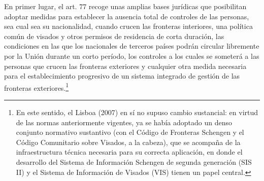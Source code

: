 \documentclass[10pt,a4paper]{article}
\begin{document}
En primer lugar, el art. $77$ recoge unas amplias bases jurídicas que posibilitan adoptar medidas para establecer la ausencia total de controles de las personas, sea cual sea su nacionalidad, cuando crucen las fronteras interiores, una política común de visados y otros permisos de residencia de corta duración, las condiciones en las que los nacionales de terceros países podrán circular libremente por la Unión durante un corto período, los controles a los cuales se someterá a las personas que crucen las fronteras exteriores y cualquier otra medida necesaria para el establecimiento progresivo de un sistema integrado de gestión de las fronteras exteriores.\footnote{%
    En este sentido, el Lisboa (2007) en sí no supuso cambio sustancial: en virtud de las normas anteriormente vigentes, ya se había adoptado un denso conjunto normativo sustantivo (con el Código de Fronteras Schengen y el Código Comunitario sobre Visados, a la cabeza), que se acompaña de la infraestructura técnica necesaria para su correcta aplicación, en donde el desarrollo del Sistema de Información Schengen de segunda generación (SIS II) y el Sistema de Información de Visados (VIS) tienen un papel central.

}
\end{document}
